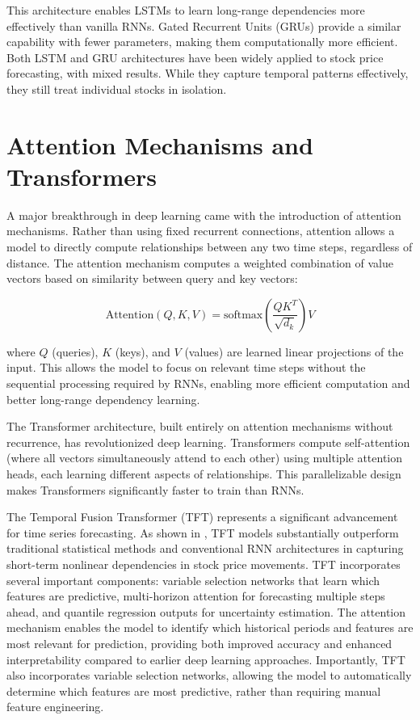 This architecture enables LSTMs to learn long-range dependencies more effectively than vanilla RNNs. Gated Recurrent Units (GRUs) provide a similar capability with fewer parameters, making them computationally more efficient. Both LSTM and GRU architectures have been widely applied to stock price forecasting, with mixed results. While they capture temporal patterns effectively, they still treat individual stocks in isolation.

\section{Attention Mechanisms and Transformers}

A major breakthrough in deep learning came with the introduction of attention mechanisms. Rather than using fixed recurrent connections, attention allows a model to directly compute relationships between any two time steps, regardless of distance. The attention mechanism computes a weighted combination of value vectors based on similarity between query and key vectors:

$$\text{Attention}(Q, K, V) = \text{softmax}\left(\frac{QK^T}{\sqrt{d_k}}\right)V$$

where $Q$ (queries), $K$ (keys), and $V$ (values) are learned linear projections of the input. This allows the model to focus on relevant time steps without the sequential processing required by RNNs, enabling more efficient computation and better long-range dependency learning.

The Transformer architecture, built entirely on attention mechanisms without recurrence, has revolutionized deep learning. Transformers compute self-attention (where all vectors simultaneously attend to each other) using multiple attention heads, each learning different aspects of relationships. This parallelizable design makes Transformers significantly faster to train than RNNs.

The Temporal Fusion Transformer (TFT) represents a significant advancement for time series forecasting. As shown in \cite{appliedmath5040176}, TFT models substantially outperform traditional statistical methods and conventional RNN architectures in capturing short-term nonlinear dependencies in stock price movements. TFT incorporates several important components: variable selection networks that learn which features are predictive, multi-horizon attention for forecasting multiple steps ahead, and quantile regression outputs for uncertainty estimation. The attention mechanism enables the model to identify which historical periods and features are most relevant for prediction, providing both improved accuracy and enhanced interpretability compared to earlier deep learning approaches. Importantly, TFT also incorporates variable selection networks, allowing the model to automatically determine which features are most predictive, rather than requiring manual feature engineering.

